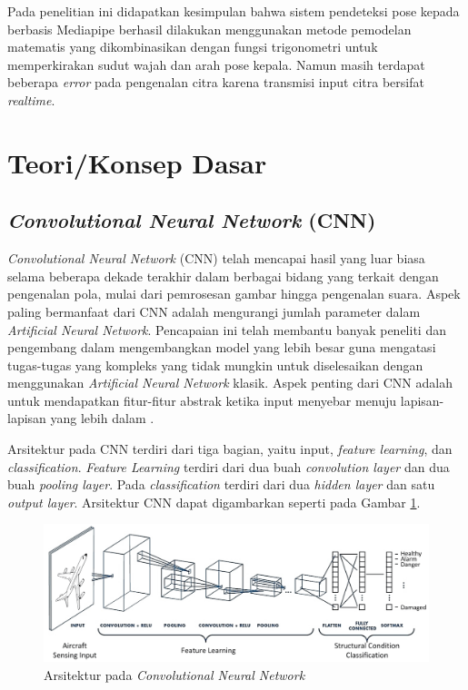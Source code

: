 Pada penelitian ini didapatkan kesimpulan bahwa sistem pendeteksi pose kepada berbasis Mediapipe berhasil dilakukan menggunakan metode pemodelan matematis yang dikombinasikan dengan fungsi trigonometri untuk memperkirakan sudut wajah dan arah pose kepala. Namun masih terdapat beberapa \emph{error} pada pengenalan citra karena transmisi input citra bersifat \emph{realtime}.

\section{Teori/Konsep Dasar}

\subsection{\emph{Convolutional Neural Network} (CNN)}

\emph{Convolutional Neural Network} (CNN) telah mencapai hasil yang luar biasa selama beberapa dekade terakhir dalam berbagai bidang yang terkait dengan pengenalan pola, mulai dari pemrosesan gambar hingga pengenalan suara. Aspek paling bermanfaat dari CNN adalah mengurangi jumlah parameter dalam \emph{Artificial Neural Network}. Pencapaian ini telah membantu banyak peneliti dan pengembang dalam mengembangkan model yang lebih besar guna mengatasi tugas-tugas yang kompleks yang tidak mungkin untuk diselesaikan dengan menggunakan \emph{Artificial Neural Network} klasik. Aspek penting dari CNN adalah untuk mendapatkan fitur-fitur abstrak ketika input menyebar menuju lapisan-lapisan yang lebih dalam \parencite{8308186}.

Arsitektur pada CNN terdiri dari tiga bagian, yaitu input, \emph{feature learning}, dan \emph{classification}. \emph{Feature Learning} terdiri dari dua buah \emph{convolution layer} dan dua buah \emph{pooling layer}. Pada \emph{classification} terdiri dari dua \emph{hidden layer} dan satu \emph{output layer}. Arsitektur CNN dapat digambarkan seperti pada Gambar \ref{fig:arsitektur cnn}.

\begin{figure} [ht] \centering
    \includegraphics[scale=0.12]{gambar/arsitekturcnn.png}
    \caption{Arsitektur pada \emph{Convolutional Neural Network}}
    \label{fig:arsitektur cnn}
\end{figure}

